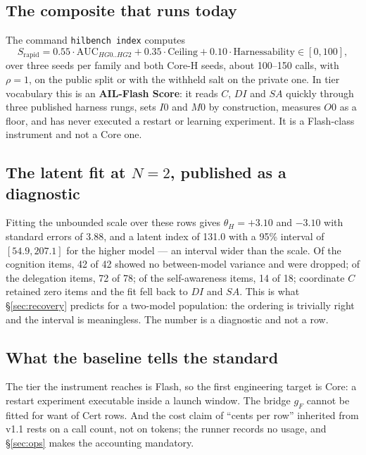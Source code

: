 \subsection{The composite that runs today}
The command \texttt{hilbench index} computes
\[
S_{\mathrm{rapid}} = 0.55\cdot\mathrm{AUC}_{HG0..HG2} + 0.35\cdot\mathrm{Ceiling} + 0.10\cdot\mathrm{Harnessability} \in [0, 100],
\]
over three seeds per family and both Core-H seeds, about 100--150 calls, with $\rho = 1$, on the public split or with the withheld salt on the private one. In tier vocabulary this is an \textbf{AIL-Flash Score}: it reads $C$, $DI$ and $SA$ quickly through three published harness rungs, sets $I0$ and $M0$ by construction, measures $O0$ as a floor, and has never executed a restart or learning experiment. It is a Flash-class instrument and not a Core one.

\begin{table}[!htbp]\centering\footnotesize

\caption{Every row the instrument has produced, as Flash-class evidence. All were run by the instrument's author, who built neither model; under \S\ref{sec:corecert} none is certified. The smaller model bluffs three times bare and gains 8.8 points from a harness that catches part of it; the larger bluffs nowhere on the public split and gains nothing there. That a harness helps the model that fails catchably is the first prediction of \S\ref{sec:predictions}, on two rows. By rule 7 the three rows are one band.}
\label{tab:baseline}
\end{table}

\subsection{The latent fit at $N = 2$, published as a diagnostic}
Fitting the unbounded scale over these rows gives $\theta_H = +3.10$ and $-3.10$ with standard errors of 3.88, and a latent index of 131.0 with a 95\% interval of $[54.9, 207.1]$ for the higher model --- an interval wider than the scale. Of the cognition items, 42 of 42 showed no between-model variance and were dropped; of the delegation items, 72 of 78; of the self-awareness items, 14 of 18; coordinate $C$ retained zero items and the fit fell back to $DI$ and $SA$. This is what \S\ref{sec:recovery} predicts for a two-model population: the ordering is trivially right and the interval is meaningless. The number is a diagnostic and not a row.

\subsection{What the baseline tells the standard}
The tier the instrument reaches is Flash, so the first engineering target is Core: a restart experiment executable inside a launch window. The bridge $g_F$ cannot be fitted for want of Cert rows. And the cost claim of ``cents per row'' inherited from v1.1 rests on a call count, not on tokens; the runner records no usage, and \S\ref{sec:ops} makes the accounting mandatory.

